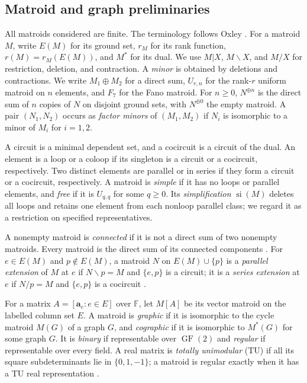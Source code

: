 \documentclass[12pt,a4paper]{article}
\numberwithin{equation}{section}
\newcommand{\F}{\mathbb F}
\theoremstyle{definition}
\theoremstyle{remark}
\begin{document}
\subsection{Matroid and graph preliminaries}\label{subsec:matroid-preliminaries}
All matroids considered are finite.  The terminology follows
Oxley \cite{oxley}.  For a matroid \(M\),
write \(E(M)\) for its ground set, \(r_M\) for its rank function,
\(r(M)=r_M(E(M))\), and \(M^*\) for its dual.  We use
\(M|X\), \(M\backslash X\), and \(M/X\) for restriction, deletion,
and contraction.  A \emph{minor} is obtained by deletions and contractions.
We write \(M_1\oplus M_2\) for a direct sum, \(U_{r,n}\) for the
rank-\(r\) uniform matroid on \(n\) elements, and \(F_7\) for the
Fano matroid.  For \(n\ge0\),
\(N^{\oplus n}\) is the direct sum of \(n\) copies of \(N\) on disjoint
ground sets, with \(N^{\oplus0}\) the empty matroid.  A pair
\((N_1,N_2)\) occurs as \emph{factor minors} of \((M_1,M_2)\) if
\(N_i\) is isomorphic to a minor of \(M_i\) for \(i=1,2\).

A circuit is a minimal dependent set, and a cocircuit is a circuit of
the dual.  An element is a loop or a coloop if its singleton is a
circuit or a cocircuit, respectively.  Two distinct elements are
parallel or in series if they form a circuit or a cocircuit, respectively.
A matroid is \emph{simple} if it has no loops or parallel elements,
and \emph{free} if it is \(U_{q,q}\) for some \(q\ge0\).
Its \emph{simplification} \(\operatorname{si}(M)\) deletes all loops
and retains one element from each nonloop parallel class; we regard
it as a restriction on specified representatives.

A nonempty matroid is \emph{connected} if it is not a direct sum of
two nonempty matroids.  Every matroid is the direct sum of its
connected components \cite[Corollary~4.2.9]{oxley}.  For
\(e\in E(M)\) and \(p\notin E(M)\), a matroid \(N\) on
\(E(M)\cup\{p\}\) is a
\emph{parallel extension} of \(M\) at \(e\) if
\(N\backslash p=M\) and \(\{e,p\}\) is a circuit; it is a
\emph{series extension} at \(e\) if \(N/p=M\) and \(\{e,p\}\)
is a cocircuit \cite[Section~5.4, pp.~151--152]{oxley}.

For a matrix \(A=[\boldsymbol a_e:e\in E]\) over \(\F\), let
\(M[A]\) be its vector matroid on the labelled column set \(E\).
A matroid is \emph{graphic} if it is isomorphic to the cycle matroid
\(M(G)\) of a graph \(G\), and \emph{cographic} if it is isomorphic
to \(M^*(G)\) for some graph \(G\).  It is \emph{binary} if representable over
\(\operatorname{GF}(2)\) and \emph{regular} if representable over
every field.  A real matrix is \emph{totally unimodular} (TU) if all
its square subdeterminants lie in \(\{0,1,-1\}\); a matroid is
regular exactly when it has a TU real representation
\cite[Lemma~2.2.21 and Theorem~6.6.3]{oxley}.
\end{document}
